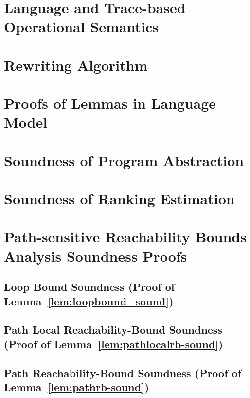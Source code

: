 \section{Language and Trace-based Operational Semantics}
\label{apdx:language}

\clearpage
\section{Rewriting Algorithm}
\label{apdx:alg-rewrite}

\clearpage

\section{Proofs of Lemmas in Language Model}
\label{apdx:lem_language}

\clearpage
\section{Soundness of Program Abstraction}
\label{apdx:abs_sound}

\clearpage
\section{Soundness of Ranking Estimation}
\label{apdx:pathinsensitive_rb_soundness}

\clearpage

\section{Path-sensitive Reachability Bounds Analysis Soundness Proofs}
\label{apdx:pathsensitive_rb_soundness}

\subsection{Loop Bound Soundness (Proof of Lemma~\ref{lem:loopbound_sound})}
\label{apdx:loopbound-sound}

\clearpage

\subsection{Path Local Reachability-Bound Soundness (Proof of Lemma~\ref{lem:pathlocalrb-sound})}
\label{apdx:pathlocalrb-sound}

\clearpage

\subsection{Path Reachability-Bound Soundness (Proof of Lemma~\ref{lem:pathrb-sound})}
\label{apdx:pathrb-sound}

\clearpage

